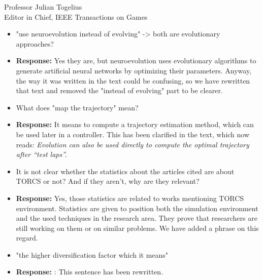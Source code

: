 \documentclass[10pt]{letter} %
\begin{document}
\begin{letter}{Professor Julian Togelius \\ Editor in Chief, IEEE Transactions on Games}
\begin{enumerate}
\begin{itemize}
\begin{itemize}
			\item "use neuroevolution instead of evolving" -> both are evolutionary approaches?
					\item {\bf Response:} 
					Yes they are, but  neuroevolution uses evolutionary algorithms to generate artificial neural networks by optimizing their parameters. Anyway, the way it was written in the text could be confusing, so we have rewritten that text and removed the "instead of evolving" part to be clearer. 
			\item What does "map the trajectory" mean?
					\item {\bf Response:} 
			It means to compute a trajectory estimation method, which can be used later in a controller. This has been clarified in the text, which now reads: {\em Evolution can also be used directly to compute the optimal trajectory after ``test laps''.}
					
			\item It is not clear whether the statistics about the articles cited are about TORCS or not? And if they aren't, why are they relevant?
					\item {\bf Response:} 
			Yes, those statistics are related to works mentioning TORCS environment. Statistics are given to position both the simulation environment and the used techniques in the research area. They prove that researchers are still working on them or on similar problems. 
We have added a phrase on this regard.
				
			\item "the higher diversification factor which it means"
					\item {\bf Response:} : This sentence has been rewritten.
			\end{itemize}
	


\end{itemize}
\end{enumerate}
\end{letter}
\end{document}

